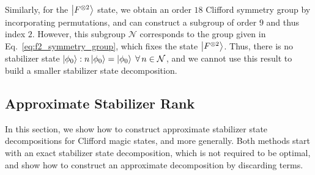 Similarly, for the $\ket{F^{\otimes 2}}$ state, we obtain an order $18$ Clifford symmetry group by incorporating permutations, and can construct a subgroup of order $9$ and thus index $2$. However, this subgroup $\mathcal{N}$ corresponds to the group given in Eq.~\ref{eq:f2_symmetry_group}, which fixes the state $\ket{F^{\otimes 2}}$. Thus, there is no stabilizer state $\ket{\phi_{0}}:n\ket{\phi_{0}}=\ket{\phi_{0}}\;\forall\,n\in\mathcal{N}$, and we cannot use this result to build a smaller stabilizer state decomposition.
\subsection{Approximate Stabilizer Rank}\label{sec:approx_results}
In this section, we show how to construct approximate stabilizer state decompositions for Clifford magic states, and more generally. Both methods start with an exact stabilizer state decomposition, which is not required to be optimal, and show how to construct an approximate decomposition by discarding terms.
